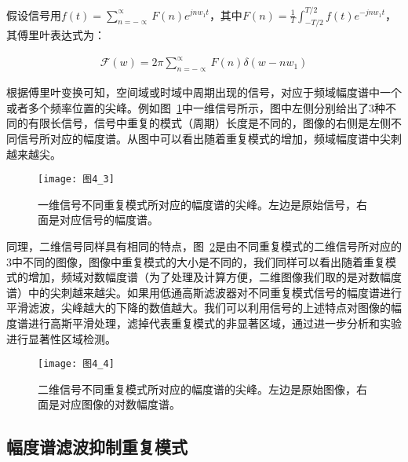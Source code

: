 假设信号用$f(t)=\sum_{n=-\propto}^{\propto}F(n)e^{jnw_{1}t}$，其中$F(n)=\frac{1}{T}\int_{-T/2}^{T/2}f(t)e^{-jnw_{1}t}$，其傅里叶表达式为：
\begin{linenomath}
\begin{align}
\mathcal{F}(w)=2\pi\sum_{n=-\propto}^{\propto}F(n)\delta(w-nw_{1})
\label{式4_1}
\end{align}
\end{linenomath}
根据傅里叶变换可知，空间域或时域中周期出现的信号，对应于频域幅度谱中一个或者多个频率位置的尖峰。例如图~\ref{图4_3}中一维信号所示，图中左侧分别给出了3种不同的有限长信号，信号中重复的模式（周期）长度是不同的，图像的右侧是左侧不同信号所对应的幅度谱。从图中可以看出随着重复模式的增加，频域幅度谱中尖刺越来越尖。
\begin{figure}[h]
  \centering
  \texttt{[image: 图4\_3]}
  \caption{一维信号不同重复模式所对应的幅度谱的尖峰。左边是原始信号，右面是对应信号的幅度谱。}   
  \label{图4_3} 
\end{figure}
同理，二维信号同样具有相同的特点，图~\ref{图4_4}是由不同重复模式的二维信号所对应的3中不同的图像，图像中重复模式的大小是不同的，我们同样可以看出随着重复模式的增加，频域对数幅度谱（为了处理及计算方便，二维图像我们取的是对数幅度谱）中的尖刺越来越尖。如果用低通高斯滤波器对不同重复模式信号的幅度谱进行平滑滤波，尖峰越大的下降的数值越大。我们可以利用信号的上述特点对图像的幅度谱进行高斯平滑处理，滤掉代表重复模式的非显著区域，通过进一步分析和实验进行显著性区域检测。
\begin{figure}[h]
  \centering
  \texttt{[image: 图4\_4]}
  \caption{二维信号不同重复模式所对应的幅度谱的尖峰。左边是原始图像，右面是对应图像的对数幅度谱。}   
  \label{图4_4} 
\end{figure}

\subsection{幅度谱滤波抑制重复模式}
\label{4_1_2}

